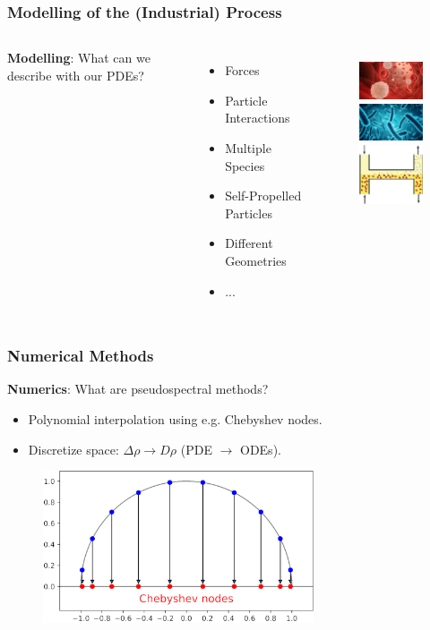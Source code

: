 \documentclass[aspectratio=169,xcolor=dvipsnames]{beamer}
\begin{document}
\begin{frame}
	\frametitle{Modelling of the (Industrial) Process}
	\begin{columns}
		\textbf{Modelling}: What can we describe with our PDEs?
		\begin{itemize}
			\item Forces
			\item Particle Interactions
			\item Multiple Species
			\item Self-Propelled Particles
			\item Different Geometries
			\item ...
		\end{itemize}
		\begin{figure}
			\includegraphics[width=3cm]{bloodcells.jpg}\\
			\includegraphics[width=3cm]{bacteria.png}\\
			\includegraphics[width=3cm]{Microfilter.png}
		\end{figure}
	\end{columns}
\end{frame}
\begin{frame}
	\frametitle{Numerical Methods}
	\textbf{Numerics}: What are pseudospectral methods?\\
	\begin{itemize}
		\item Polynomial interpolation using e.g. Chebyshev nodes.
		\item Discretize space: $\Delta \rho \to D \rho$ (PDE $\to$ ODEs).
	\end{itemize}
	
	
	\begin{figure}
		\includegraphics[width=8cm]{chebnodes1.png}\\
	\end{figure}	
\end{frame}

\end{document}
